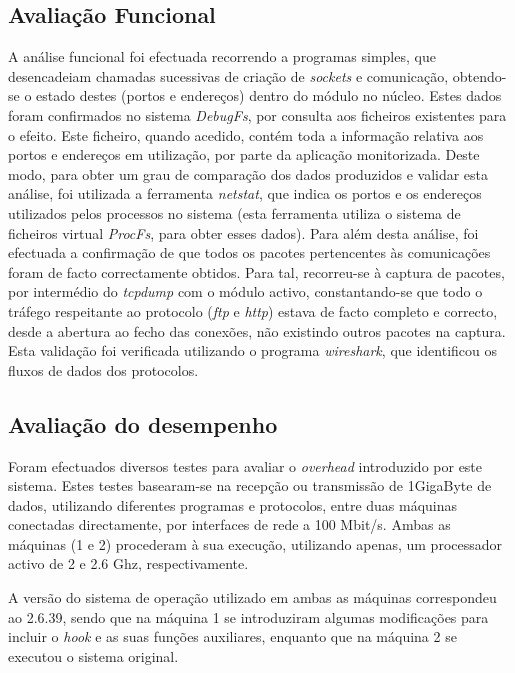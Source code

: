 \subsection{Avaliação Funcional}
\label{sub:eval_functional}
A análise funcional foi efectuada recorrendo a programas simples, que desencadeiam chamadas sucessivas de criação de \textit{sockets} e comunicação, obtendo-se o estado destes (portos e endereços) dentro do módulo no núcleo.
Estes dados foram confirmados no sistema \textit{DebugFs}, por consulta aos ficheiros existentes para o efeito.
Este ficheiro, quando acedido, contém toda a informação relativa aos portos e endereços em utilização, por parte da aplicação monitorizada.
Deste modo, para obter um grau de comparação dos dados produzidos e validar esta análise, foi utilizada a ferramenta \textit{netstat}, que indica os portos e os endereços utilizados pelos processos no sistema (esta ferramenta utiliza o sistema de ficheiros virtual \textit{ProcFs}, para obter esses dados).
Para além desta análise, foi efectuada a confirmação de que todos os pacotes pertencentes às comunicações foram de facto correctamente obtidos.
Para tal, recorreu-se à captura de pacotes, por intermédio do \textit{tcpdump} com o módulo activo, constantando-se que todo o tráfego respeitante ao protocolo (\textit{ftp} e \textit{http}) estava de facto completo e correcto, desde a abertura ao fecho das conexões, não existindo outros pacotes na captura.
Esta validação foi verificada utilizando o programa \textit{wireshark}, que identificou os fluxos de dados dos protocolos.

\subsection{Avaliação do desempenho}
\label{sub:eval_performance}
Foram efectuados diversos testes para avaliar o \emph{overhead} introduzido por este sistema.
 Estes testes basearam-se na recepção ou transmissão de 1GigaByte de dados, utilizando diferentes programas e protocolos, entre duas máquinas conectadas directamente, por interfaces de rede a 100 Mbit/s.
 Ambas as máquinas (1 e 2) procederam à sua execução, utilizando apenas, um processador activo de 2 e 2.6 Ghz, respectivamente.

A versão do sistema de operação utilizado em ambas as máquinas correspondeu ao 2.6.39, sendo que na máquina 1 se introduziram algumas modificações para incluir o \textit{hook} e as suas funções auxiliares, enquanto que na máquina 2 se executou o sistema original.

